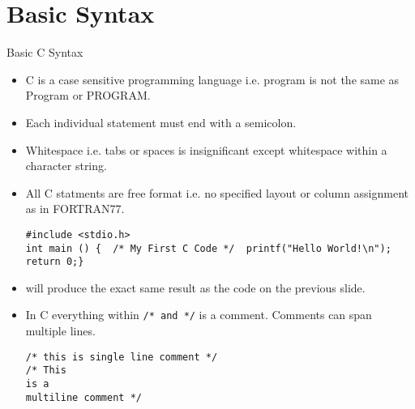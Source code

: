 \documentclass[10pt,t]{beamer}
\begin{document}
\section{Basic Syntax}
\begin{frame}{Basic C Syntax}
  \begin{itemize}
    \item C is a case sensitive programming language i.e. program is not the same as Program or PROGRAM.
    \item Each individual statement must end with a semicolon. 
    \item Whitespace i.e. tabs or spaces is insignificant except whitespace within a character string.
    \item All C statments are free format i.e. no specified layout or column assignment as in FORTRAN77.
      \begin{lstlisting}
#include <stdio.h>
int main () {  /* My First C Code */  printf("Hello World!\n");  return 0;}
      \end{lstlisting}
    \item[] will produce the exact same result as the code on the previous slide.
    \item In C everything within \lstinline|/* and */| is a comment. Comments can span multiple lines.
      \begin{lstlisting}
/* this is single line comment */
/* This
is a 
multiline comment */
      \end{lstlisting}
  \end{itemize}
\end{frame}
\end{document}
